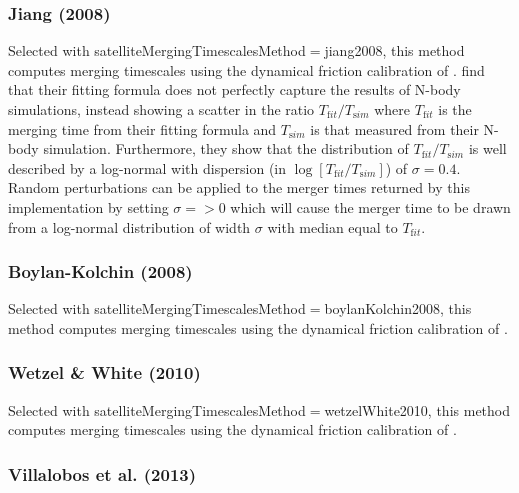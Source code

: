 \subsubsection{Jiang (2008)}\label{phys:satelliteMergingTimescales:satelliteMergingTimescalesJiang2008}

Selected with {\normalfont \ttfamily satelliteMergingTimescalesMethod}$=${\normalfont \ttfamily jiang2008}, this method computes merging timescales using the dynamical friction calibration of \cite{jiang_fitting_2008}. \cite{jiang_fitting_2008} find that their fitting formula does not perfectly capture the results of N-body simulations, instead showing a scatter in the ratio $T_{\mathrm fit}/T_{\mathrm sim}$ where $T_{\mathrm fit}$ is the merging time from their fitting formula and $T_{\mathrm sim}$ is that measured from their N-body simulation. Furthermore, they show that the distribution of $T_{\mathrm fit}/T_{\mathrm sim}$ is well described by a log-normal with dispersion (in $\log[T_{\mathrm fit}/T_{\mathrm sim}]$) of $\sigma=0.4$. Random perturbations can be applied to the merger times returned by this implementation by setting $\sigma=${\normalfont {}}$>0$ which will cause the merger time to be drawn from a log-normal distribution of width $\sigma$ with median equal to $T_{\mathrm fit}$.


\subsubsection{Boylan-Kolchin (2008)}\label{phys:satelliteMergingTimescales:satelliteMergingTimescalesBoylanKolchin2008}

Selected with {\normalfont \ttfamily satelliteMergingTimescalesMethod}$=${\normalfont \ttfamily boylanKolchin2008}, this method computes merging timescales using the dynamical friction calibration of \cite{boylan-kolchin_dynamical_2008}.

\subsubsection{Wetzel \& White (2010)}\label{phys:satelliteMergingTimescales:satelliteMergingTimescalesWetzelWhite2010}

Selected with {\normalfont \ttfamily satelliteMergingTimescalesMethod}$=${\normalfont \ttfamily wetzelWhite2010}, this method computes merging timescales using the dynamical friction calibration of \cite{wetzel_what_2010}.

\subsubsection{Villalobos et al. (2013)}\label{phys:satelliteMergingTimescales:satelliteMergingTimescalesVillalobos2013}

